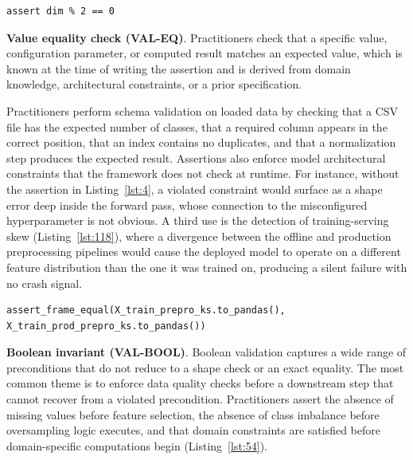 \documentclass[a4paper,USenglish,cleveref,autoref,thm-restate,anonymous]{lipics-v2021}       %
\begin{document}
\begin{lstlisting}[caption={Check that the sinusoidal positional embeddings have an even dimension
because the vector is split between sine and cosine components.}, label={lst:4}]
assert dim % 2 == 0
\end{lstlisting}

\textbf{Value equality check (VAL-EQ)}.
Practitioners check that a specific value, configuration parameter, or computed result
matches an expected value,
which is known at the time of writing the assertion
and is derived from domain knowledge, architectural constraints, or a prior specification.

Practitioners perform schema validation on loaded data
by checking that a CSV file has the expected number of classes,
that a required column appears in the correct position,
that an index contains no duplicates,
and that a normalization step produces the expected result.
Assertions also enforce model architectural constraints
that the framework does not check at runtime.
For instance, without the assertion in Listing~\ref{lst:4},
a violated constraint would surface as a shape error deep inside the forward pass,
whose connection to the misconfigured hyperparameter is not obvious.
A third use is the detection of training-serving skew (Listing~\ref{lst:118}),
where a divergence between the offline and production preprocessing pipelines
would cause the deployed model
to operate on a different feature distribution than the one it was trained on,
producing a silent failure with no crash signal.

\begin{lstlisting}[caption={Verify that the offline preprocessing pipeline
and the production preprocessing pipeline
produce identical training data after feature selection.}, label={lst:118}]
assert_frame_equal(X_train_prepro_ks.to_pandas(), X_train_prod_prepro_ks.to_pandas())
\end{lstlisting}

\textbf{Boolean invariant (VAL-BOOL)}.
Boolean validation captures a wide range of preconditions
that do not reduce to a shape check or an exact equality.
The most common theme
is to enforce data quality checks
before a downstream step
that cannot recover from a violated precondition.
Practitioners assert the absence of missing values before feature selection,
the absence of class imbalance before oversampling logic executes,
and that domain constraints are satisfied
before domain-specific computations begin (Listing~\ref{lst:54}).
\end{document}

